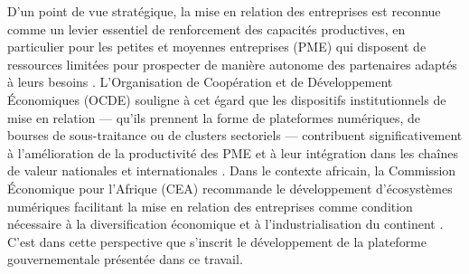 \documentclass[]{article}
\begin{document}
	D'un point de vue stratégique, la mise en relation des entreprises est reconnue comme
	un levier essentiel de renforcement des capacités productives, en particulier pour les
	petites et moyennes entreprises (PME) qui disposent de ressources limitées pour
	prospecter de manière autonome des partenaires adaptés à leurs besoins
	\citep{oecd_sme_2021}. L'Organisation de Coopération et de Développement Économiques
	(OCDE) souligne à cet égard que les dispositifs institutionnels de mise en relation
	--- qu'ils prennent la forme de plateformes numériques, de bourses de sous-traitance
	ou de clusters sectoriels --- contribuent significativement à l'amélioration de la
	productivité des PME et à leur intégration dans les chaînes de valeur nationales et
	internationales \citep{oecd_sme_2021}. Dans le contexte africain, la Commission
	Économique pour l'Afrique (CEA) recommande le développement d'écosystèmes
	numériques facilitant la mise en relation des entreprises comme condition nécessaire
	à la diversification économique et à l'industrialisation du continent
	\citep{uneca_digital_2023}. C'est dans cette perspective que s'inscrit le développement
	de la plateforme gouvernementale présentée dans ce travail.
	
\end{document}
